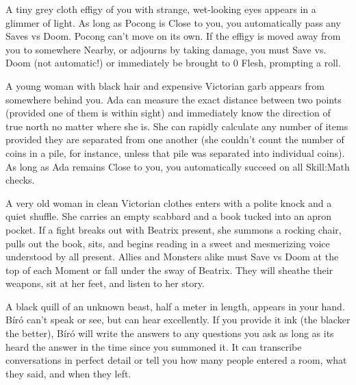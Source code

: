 
A tiny grey cloth effigy of you with strange, wet-looking eyes appears in a glimmer of light.  As long as Pocong is Close to you, you automatically pass any Saves vs Doom.  Pocong can't move on its own.  If the effigy is moved away from you to somewhere Nearby, or adjourns by taking damage, you must Save vs. Doom (not automatic!) or immediately be brought to 0 Flesh, prompting a \DEATH roll.






A young woman with black hair and expensive Victorian garb appears from somewhere behind you.  Ada can measure the exact distance between two points (provided one of them is within sight) and immediately know the direction of true north no matter where she is.  She can rapidly calculate any number of items provided they are separated from one another (she couldn't count the number of coins in a pile, for instance, unless that pile was separated into individual coins).  As long as Ada remains Close to you, you automatically succeed on all Skill:Math checks.




A very old woman in clean Victorian clothes enters with a polite knock and a quiet shuffle.  She carries an empty scabbard and a book tucked into an apron pocket.  If a fight breaks out with Beatrix present, she summons a rocking chair, pulls out the book, sits, and begins reading in a sweet and mesmerizing voice understood by all present.  Allies and Monsters alike must Save vs Doom at the top of each Moment or fall under the sway of Beatrix.  They will sheathe their weapons, sit at her feet, and listen to her story.


A black quill of an unknown beast, half a meter in length, appears in your hand.  Bíró can't speak or see, but can hear excellently.  If you provide it ink (the blacker the better), Bíró will write the answers to any questions you ask as long as its heard the answer in the time since you summoned it.  It can transcribe conversations in perfect detail or tell you how many people entered a room, what they said, and when they left.

